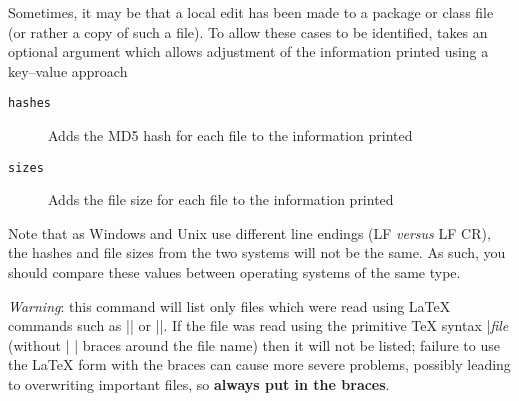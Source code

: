 \documentclass{ltxguide}
\begin{document}
Sometimes, it may be that a local edit has been made to a package or
class file (or rather a copy of such a file). To allow these cases to
be identified,  takes an optional argument which allows
adjustment of the information printed using a key--value approach
\begin{description}
  \item[\texttt{hashes}] Adds the MD5 hash for each file to the
    information printed
  \item[\texttt{sizes}] Adds the file size for each file to the
    information printed
\end{description}
Note that as Windows and Unix use different line endings (LF \emph{versus} LF
CR), the hashes and file sizes from the two systems will not be the same. As
such, you should compare these values between operating systems of the same
type.

\emph{Warning}: this command will list only files which were read
using \LaTeX{} commands such as || or
||.  If the file was read using the primitive \TeX{}
syntax |\emph{file} (without |{ }| braces around the file name)
then it will not be listed; failure to use the \LaTeX{} form with the
braces can cause more severe problems, possibly leading to overwriting
important files, so \textbf{always put in the braces}.
\end{document}
